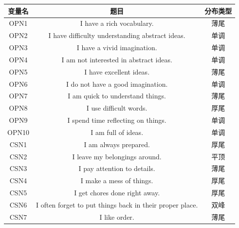 \documentclass[UTF8]{ctexart}
\begin{document}
\begin{longtable}{c|c|c}
  \hline
  \textbf{变量名} & \textbf{题目}                                              & \textbf{分布类型} \\\hline
  OPN1         & I have a rich vocabulary.                                & 薄尾            \\\hline
  OPN2         & I have difficulty understanding abstract ideas.          & 单调            \\\hline
  OPN3         & I have a vivid imagination.                              & 单调            \\\hline
  OPN4         & I am not interested in abstract ideas.                   & 单调            \\\hline
  OPN5         & I have excellent ideas.                                  & 薄尾            \\\hline
  OPN6         & I do not have a good imagination.                        & 单调            \\\hline
  OPN7         & I am quick to understand things.                         & 薄尾            \\\hline
  OPN8         & I use difficult words.                                   & 厚尾            \\\hline
  OPN9         & I spend time reflecting on things.                       & 单调            \\\hline
  OPN10        & I am full of ideas.                                      & 单调            \\\hline
  CSN1         & I am always prepared.                                    & 厚尾            \\\hline
  CSN2         & I leave my belongings around.                            & 平顶            \\\hline
  CSN3         & I pay attention to details.                              & 薄尾            \\\hline
  CSN4         & I make a mess of things.                                 & 厚尾            \\\hline
  CSN5         & I get chores done right away.                            & 厚尾            \\\hline
  CSN6         & I often forget to put things back in their proper place. & 双峰            \\\hline
  CSN7         & I like order.                                            & 薄尾            \\\hline

\end{longtable}
\end{document}
